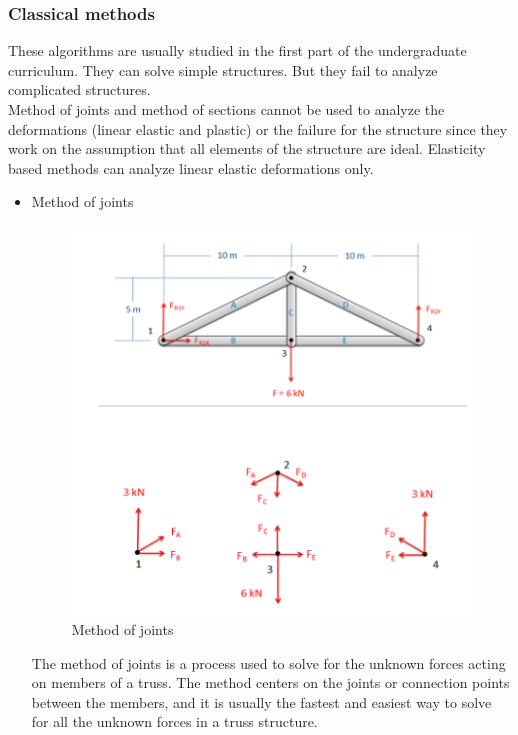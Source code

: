 \documentclass[12pt]{article}
\begin{document}
\subsubsection{Classical methods}
These algorithms are usually studied in the first part of the undergraduate curriculum. They can solve simple structures. But they fail to analyze complicated structures.\\ Method of joints and method of sections cannot be used to analyze the deformations (linear elastic and plastic) or the failure for the structure since they work on the assumption that all elements of the structure are ideal. Elasticity based methods can analyze linear elastic deformations only.\\
\begin{itemize}
    \item Method of joints\\
    \begin{figure}[H]
        \centering
        \includegraphics{images/methodOfJoints.png}
        \caption{Method of joints}
        \label{fig:jointsMethod}
    \end{figure}
    The method of joints is a process used to solve for the unknown forces acting on members of a truss. The method centers on the joints or connection points between the members, and it is usually the fastest and easiest way to solve for all the unknown forces in a truss structure.\cite{adaptive-map}



\end{itemize}
\end{document}
